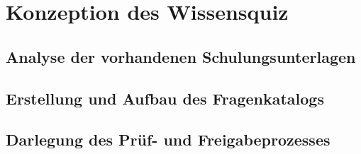 \chapter{Konzeption des Wissensquiz}
\section{Analyse der vorhandenen Schulungsunterlagen}
\section{Erstellung und Aufbau des Fragenkatalogs}
\section{Darlegung des Prüf- und Freigabeprozesses}
